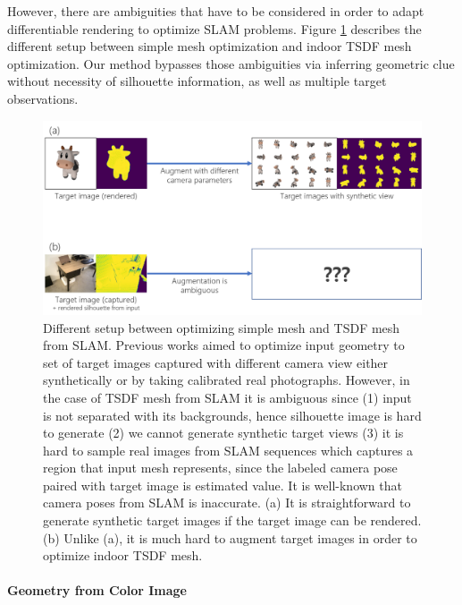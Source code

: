 However, there are ambiguities that have to be considered in order to adapt differentiable rendering to optimize SLAM problems. 
Figure \ref{fig:difference_simple_mesh_and_tsdf_mesh} describes the different setup between simple mesh optimization and indoor TSDF mesh optimization. 
Our method bypasses those ambiguities via inferring geometric clue 
without necessity of silhouette information, as well as multiple target observations.
\begin{figure}
    \includegraphics[width=\columnwidth]{figures/2_prev_difference_simple_mesh_and_tsdf_mesh.png}
    \caption{Different setup between optimizing simple mesh and TSDF mesh from SLAM. Previous works aimed to optimize input geometry to set of target images captured with different camera view either synthetically\cite{ravi2020accelerating}\cite{jatavallabhula2019kaolin}\cite{laine2020modular}\cite{nimier2019mitsuba} or by taking calibrated real photographs\cite{nimier2019mitsuba}. However, in the case of TSDF mesh from SLAM it is ambiguous since (1) input is not separated with its backgrounds, hence silhouette image is hard to generate (2) we cannot generate synthetic target views (3) it is hard to sample real images from SLAM sequences which captures a region that input mesh represents, since the labeled camera pose paired with target image is estimated value. It is well-known that camera poses from SLAM is inaccurate. (a) It is straightforward to generate synthetic target images if the target image can be rendered. (b) Unlike (a), it is much hard to augment target images in order to optimize indoor TSDF mesh.}
    \label{fig:difference_simple_mesh_and_tsdf_mesh}
\end{figure}

\paragraph{Geometry from Color Image}

